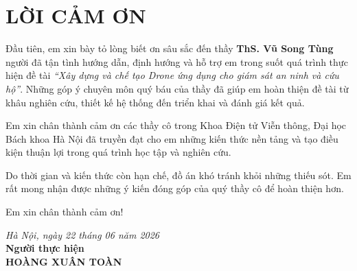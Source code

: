 \section*{LỜI CẢM ƠN}
\thispagestyle{empty}

Đầu tiên, em xin bày tỏ lòng biết ơn sâu sắc đến thầy \textbf{ThS. Vũ Song Tùng} người đã tận tình hướng dẫn, định hướng và hỗ trợ em trong suốt quá trình thực hiện đề tài \textit{``Xây dựng và chế tạo Drone ứng dụng cho giám sát an ninh và cứu hộ''}. Những góp ý chuyên môn quý báu của thầy đã giúp em hoàn thiện đề tài từ khâu nghiên cứu, thiết kế hệ thống đến triển khai và đánh giá kết quả.

Em xin chân thành cảm ơn các thầy cô trong Khoa Điện tử Viễn thông, Đại học Bách khoa Hà Nội đã truyền đạt cho em những kiến thức nền tảng và tạo điều kiện thuận lợi trong quá trình học tập và nghiên cứu.

Do thời gian và kiến thức còn hạn chế, đồ án khó tránh khỏi những thiếu sót. Em rất mong nhận được những ý kiến đóng góp của quý thầy cô để hoàn thiện hơn.

Em xin chân thành cảm ơn!

\vspace{0.5cm}
\hfill
\begin{minipage}{0.5\textwidth}
    \centering
    \textit{Hà Nội, ngày 22 tháng 06 năm 2026} \\
    \vspace{0.2cm}
    \textbf{Người thực hiện} \\
    \vspace{2cm}
    \textbf{HOÀNG XUÂN TOÀN}
\end{minipage}
\cleardoublepage
